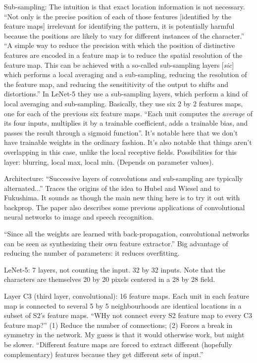 \documentclass[12pt]{article}
\begin{document}
Sub-sampling: The intuition is that exact location information is not
necessary.  ``Not only is the precise position of each of those
features [identified by the feature maps] irrelevant for identifying
the pattern, it is potentially harmful because the positions are
likely to vary for different instances of the character.''  ``A simple
way to reduce the precision with which the position of distinctive
features are encoded in a feature map is to reduce the spatial
resolution of the feature map.  This can be achieved with a so-called
sub-sampling layers [\emph{sic}] which performs a local averaging and
a sub-sampling, reducing the resolution of the feature map, and
reducing the sensititivity of the output to shifts and distortions.''
In LeNet-5 they use a sub-sampling layers, which perform a kind of
local averaging and sub-sampling.  Basically, they use six 2 by 2
features maps, one for each of the previous six feature maps.  ``Each
unit computes the \emph{average} of its four inputs, multiplies it by
a trainable coefficient, adds a trainable bias, and passes the result
through a sigmoid function''.  It's notable here that we don't have
trainable weights in the ordinary fashion.  It's also notable that
things aren't overlapping in this case, unlike the local receptive
fields.  Possibilities for this layer: blurring, local max, local min.
(Depends on parameter values).  

Architecture: ``Successive layers of convolutions and sub-sampling are
typically alternated...''  Traces the origins of the idea to Hubel and
Wiesel and to Fukushima.  It sounds as though the main new thing here
is to try it out with backprop.  The paper also describes some
previous applications of convolutional neural networks to image and
speech recognition.

``Since all the weights are learned with back-propagation,
convolutional networks can be seen as synthesizing their own feature
extractor.''  Big advantage of reducing the number of parameters: it
reduces overfitting.

LeNet-5: 7 layers, not counting the input.  32 by 32 inputs.  Note
that the characters are themselves 20 by 20 pixels centered in a 28 by
28 field.

Layer C3 (third layer, convolutional): 16 feature maps.  Each unit in
each feature map is connected to several 5 by 5 neighbourhoods are
identical locations in a subset of S2's feature maps.  ``WHy not
connect every S2 feature map to every C3 feature map?''  (1) Reduce
the number of connections; (2) Forces a break in symmetry in the
network.  My guess is that it would otherwise work, but might be
slower.  ``Different feature maps are forced to extract different
(hopefully complementary) features because they get different sets of
input.''
\end{document}
